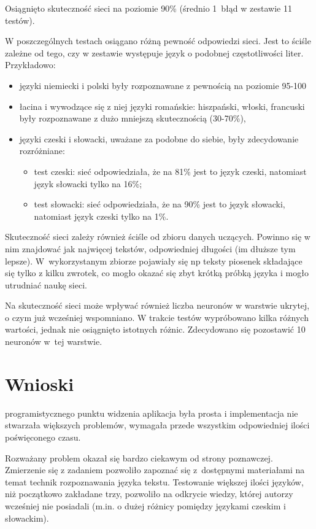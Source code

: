 \documentclass[journal]{IEEEtran}
\begin{document}
Osiągnięto skuteczność sieci na poziomie 90\% (średnio 1~błąd w zestawie 11 testów).

W poszczególnych testach osiągano różną pewność odpowiedzi sieci. Jest to ściśle zależne od tego, czy w zestawie występuje język
o podobnej częstotliwości liter. Przykładowo:
\begin{itemize}
 \item języki niemiecki i polski były rozpoznawane z pewnością na poziomie 95-100%
 \item łacina i wywodzące się z niej języki romańskie: hiszpański, włoski, francuski były rozpoznawane z dużo mniejszą
skutecznością (30-70\%),
 \item języki czeski i słowacki, uważane za podobne do siebie, były zdecydowanie rozróżniane:
  \begin{itemize}
   \item test czeski: sieć odpowiedziała, że na 81\% jest to język czeski, natomiast język słowacki tylko na 16\%;
   \item test słowacki: sieć odpowiedziała, że na 90\% jest to język słowacki, natomiast język czeski tylko na 1\%.
  \end{itemize}
\end{itemize}

Skuteczność sieci zależy również ściśle od zbioru danych uczących. Powinno się w nim znajdować jak najwięcej tekstów,
odpowiedniej długości (im dłuższe tym lepsze). W~wykorzystanym zbiorze pojawiały się np teksty piosenek składające się tylko
z kilku zwrotek, co mogło okazać się zbyt krótką próbką języka i mogło utrudniać naukę sieci.

Na skuteczność sieci może wpływać również liczba neuronów w warstwie ukrytej, o czym już wcześniej wspomniano. W trakcie
testów wypróbowano kilka różnych wartości, jednak nie osiągnięto istotnych różnic. Zdecydowano się pozostawić 10 neuronów
w~tej warstwie.


\section{Wnioski}
 programistycznego punktu widzenia aplikacja była prosta i implementacja nie stwarzała większych
problemów, wymagała przede wszystkim odpowiedniej ilości poświęconego czasu.

Rozważany problem okazał się bardzo ciekawym od strony poznawczej. Zmierzenie się z zadaniem pozwoliło zapoznać się
z~dostępnymi materiałami na temat technik rozpoznawania języka tekstu. Testowanie większej ilości języków, niż początkowo
zakładane trzy, pozwoliło na odkrycie wiedzy, której autorzy wcześniej nie posiadali (m.in. o dużej różnicy pomiędzy
językami czeskim i słowackim).
\end{document}
